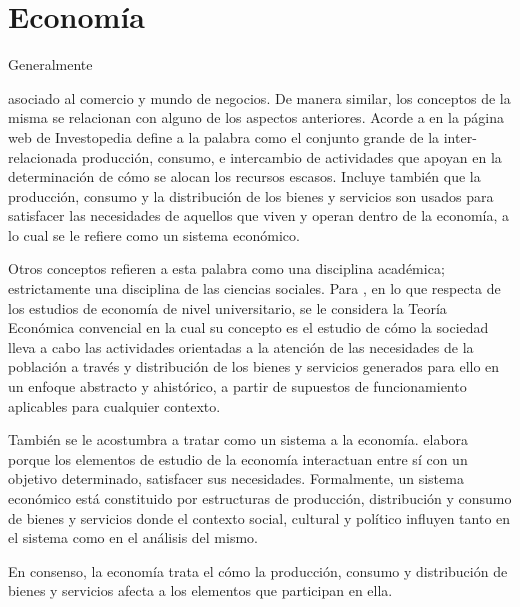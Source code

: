 \documentclass[stu, 12pt, letterpaper, donotrepeattitle, floatsintext, natbib]{apa7}
\begin{document}
\section{Economía}
Generalmente \begin{justifying}asociado al comercio y mundo de negocios. De manera similar, los conceptos de la misma se relacionan con alguno de los aspectos anteriores.
Acorde a \cite{kenton-no-date}
en la página web de Investopedia define a la palabra como el conjunto grande de la inter-relacionada producción, consumo, e intercambio de actividades que apoyan en la determinación
de cómo se alocan los recursos escasos. Incluye también que la producción, consumo y la distribución de los bienes y servicios son usados para satisfacer las 
necesidades de aquellos que viven y operan dentro de la economía, a lo cual se le refiere como un sistema económico.\par
\vspace{\baselineskip}
Otros conceptos refieren a esta palabra como una disciplina académica; estrictamente una disciplina de las ciencias sociales. Para \cite{alburquerque-2018}, en lo que respecta de los estudios
de economía de nivel universitario, se le considera la Teoría Económica convencial en la cual su concepto es el estudio de cómo la sociedad lleva a cabo las actividades
orientadas a la atención de las necesidades de la población a través y distribución de los bienes y servicios generados para ello en un enfoque abstracto y ahistórico, a partir
de supuestos de funcionamiento aplicables para cualquier contexto.\par
\vspace{\baselineskip}
También se le acostumbra a tratar como un sistema a la economía. \cite{alburquerque-2018} elabora
porque los elementos de estudio de la economía interactuan entre sí con un objetivo determinado, satisfacer
sus necesidades. Formalmente, un sistema económico está constituido por estructuras de producción, distribución y consumo de bienes y servicios donde el contexto social, cultural 
y político influyen tanto en el sistema como en el análisis del mismo.\par
\vspace{\baselineskip}
\noindent En consenso, la economía trata el cómo la producción, consumo y distribución de bienes y servicios afecta a los elementos que participan en ella.\par\end{justifying}
\vspace{\baselineskip}
\end{document}
